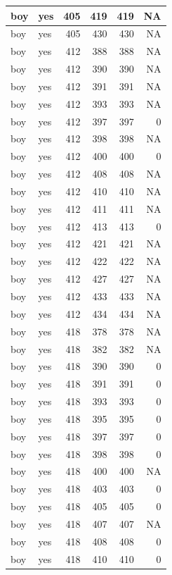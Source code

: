 \documentclass[man]{apa6}
\begin{document}
\begin{tabular}{l|l|r|r|r|r}
\hline
boy & yes & 405 & 419 & 419 & NA\\
\hline
boy & yes & 405 & 430 & 430 & NA\\
\hline
boy & yes & 412 & 388 & 388 & NA\\
\hline
boy & yes & 412 & 390 & 390 & NA\\
\hline
boy & yes & 412 & 391 & 391 & NA\\
\hline
boy & yes & 412 & 393 & 393 & NA\\
\hline
boy & yes & 412 & 397 & 397 & 0\\
\hline
boy & yes & 412 & 398 & 398 & NA\\
\hline
boy & yes & 412 & 400 & 400 & 0\\
\hline
boy & yes & 412 & 408 & 408 & NA\\
\hline
boy & yes & 412 & 410 & 410 & NA\\
\hline
boy & yes & 412 & 411 & 411 & NA\\
\hline
boy & yes & 412 & 413 & 413 & 0\\
\hline
boy & yes & 412 & 421 & 421 & NA\\
\hline
boy & yes & 412 & 422 & 422 & NA\\
\hline
boy & yes & 412 & 427 & 427 & NA\\
\hline
boy & yes & 412 & 433 & 433 & NA\\
\hline
boy & yes & 412 & 434 & 434 & NA\\
\hline
boy & yes & 418 & 378 & 378 & NA\\
\hline
boy & yes & 418 & 382 & 382 & NA\\
\hline
boy & yes & 418 & 390 & 390 & 0\\
\hline
boy & yes & 418 & 391 & 391 & 0\\
\hline
boy & yes & 418 & 393 & 393 & 0\\
\hline
boy & yes & 418 & 395 & 395 & 0\\
\hline
boy & yes & 418 & 397 & 397 & 0\\
\hline
boy & yes & 418 & 398 & 398 & 0\\
\hline
boy & yes & 418 & 400 & 400 & NA\\
\hline
boy & yes & 418 & 403 & 403 & 0\\
\hline
boy & yes & 418 & 405 & 405 & 0\\
\hline
boy & yes & 418 & 407 & 407 & NA\\
\hline
boy & yes & 418 & 408 & 408 & 0\\
\hline
boy & yes & 418 & 410 & 410 & 0\\

\end{tabular}
\end{document}
